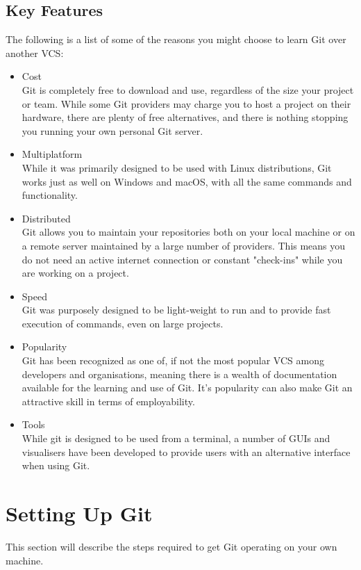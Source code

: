\documentclass[10pt, a4paper, titlepage]{article}
\begin{document}
\subsection{Key Features}
The following is a list of some of the reasons you might choose to learn Git
over another VCS:
\begin{itemize} 
\item Cost \\
Git is completely free to download and use, regardless of the size your
project or team.  
While some Git providers may charge you to host a project on
their hardware, there are plenty of free alternatives, and there is nothing
stopping you running your own personal Git server.  
\item Multiplatform \\ 
While it was primarily designed to be used with Linux distributions, Git works
just as well on Windows and macOS, with all the same commands and functionality.
\item Distributed \\ 
Git allows you to maintain your repositories both on your local machine or on
a remote server maintained by a large number of providers. 
This means you do not need an active internet connection or constant
"check-ins" while you are working on a project.
\item Speed \\
Git was purposely designed to be light-weight to run and to provide fast
execution of commands, even on large projects.
\item Popularity \\ 
Git has been recognized as one of, if not the most popular VCS among
developers and organisations, meaning there is a wealth of documentation
available for the learning and use of Git. 
It's popularity can also make Git an attractive skill in terms of
employability.
\item Tools \\
While git is designed to be used from a terminal, a number of GUIs and
visualisers have been developed to provide users with an alternative interface
when using Git.
\end{itemize}



\section{Setting Up Git}
This section will describe the steps required to get Git operating on your own
machine. 
\end{document}
